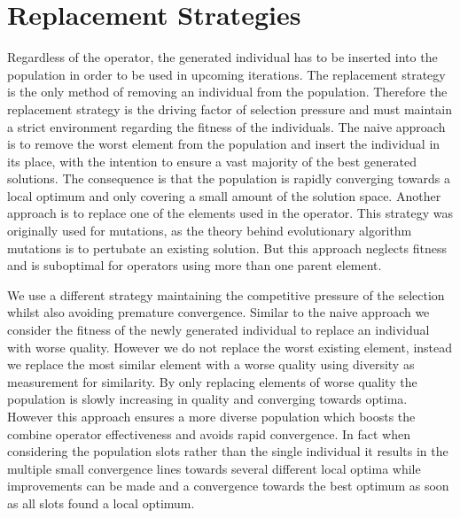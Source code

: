 \documentclass[a4paper,12pt,titlepage, BCOR7mm,headsepline]{scrbook}
\numberwithin{equation}{section}
\begin{document}
\section{Replacement Strategies}
\label{sec:replacement}
Regardless of the operator, the generated individual has to be inserted into the population in order to be used in upcoming iterations. The replacement strategy is the only method of removing an individual from the population.
Therefore the replacement strategy is the driving factor of selection pressure and must maintain a strict environment regarding the fitness of the individuals. 
The naive approach is to remove the worst element from the population and insert the individual in its place, with the intention to ensure a vast majority of the best generated solutions.
The consequence is that the population is rapidly converging towards a local optimum and only covering a small amount of the solution space. Another approach is to replace one of the elements used in the operator. This strategy was originally used for mutations, as the theory behind evolutionary algorithm mutations is to pertubate an existing solution. But this approach neglects fitness and is suboptimal for operators using more than one parent element. 


We use a different strategy maintaining the competitive pressure of the selection whilst also avoiding premature convergence. Similar to the naive approach we consider the fitness of the newly generated individual to replace an individual with worse quality. However we do not replace the worst existing element, instead we replace the most similar element with a worse quality using diversity as measurement for similarity. By only replacing elements of worse quality the population is slowly increasing in quality and converging towards optima. However this approach ensures a more diverse population 
which boosts the combine operator effectiveness and avoids rapid convergence. In fact when considering the population slots rather than the single individual it results in the multiple small convergence lines towards several different local optima while improvements can be made and a convergence towards the best optimum as soon as all slots found a local optimum. 
\end{document}
